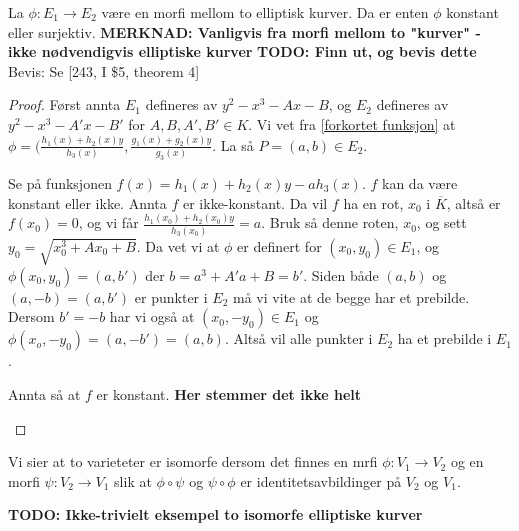 \begin{teorem}
\label{morfi konstant eller surjektiv}
La $\phi: E_1 \rightarrow E_2$ være en morfi mellom to elliptisk kurver. Da er enten $\phi$ konstant eller surjektiv. \textbf{MERKNAD: Vanligvis fra morfi mellom to "kurver" - ikke nødvendigvis elliptiske kurver}
\textbf{TODO: Finn ut, og bevis dette}
Bevis:
Se [243, I \$5, theorem 4]
\begin{proof}
Først annta $E_1$ defineres av $y^2 - x^3 - Ax - B$, og $E_2$ defineres av $y^2 - x^3 - A'x - B'$ for $A, B, A', B' \in K$.
Vi vet fra \ref{forkortet funksjon} at $\phi = (\frac{h_1(x) + h_2(x)y}{h_3(x)}, \frac{g_1(x) + g_2(x)y}{g_3(x)}$. La så $P = (a,b) \in E_2$. 

Se på funksjonen $f(x) = h_1(x) + h_2(x)y - a h_3(x)$. $f$ kan da være konstant eller ikke.
Annta $f$ er ikke-konstant. Da vil $f$ ha en rot, $x_0$ i $\overline{K}$, altså er $f(x_0) = 0$, og vi får $\frac{h_1(x_0) + h_2(x_0)y}{h_3(x_0)} = a$. Bruk så denne roten, $x_0$, og sett $y_0 = \sqrt{x_0^3 + Ax_0 + B}$. Da vet vi at $\phi$ er definert for $(x_0, y_0) \in E_1$, og  $\phi(x_0, y_0) = (a, b')$ der $b = a^3 + A'a+B = b'$. Siden både $(a, b)$ og $(a,-b) = (a, b')$ er punkter i $E_2$ må vi vite at de begge har et prebilde. Dersom $b' = -b$ har vi også at $(x_0, -y_0) \in E_1$ og $\phi(x_o, -y_0) = (a, -b') = (a,b)$. Altså vil alle punkter i $E_2$ ha et prebilde i $E_1$.

Annta så at $f$ er konstant. \textbf{Her stemmer det ikke helt}

\cite[II 2.1]{silverman}
\end{proof}
\end{teorem}

\begin{definisjon}
Vi sier at to varieteter er isomorfe dersom det finnes en mrfi $\phi: V_1 \rightarrow V_2$ og en morfi $\psi: V_2 \rightarrow V_1$ slik at $\phi \circ \psi$ og $\psi \circ \phi$ er identitetsavbildinger på $V_2$ og $V_1$. 
\end{definisjon}

\textbf{TODO: Ikke-trivielt eksempel to isomorfe elliptiske kurver}

